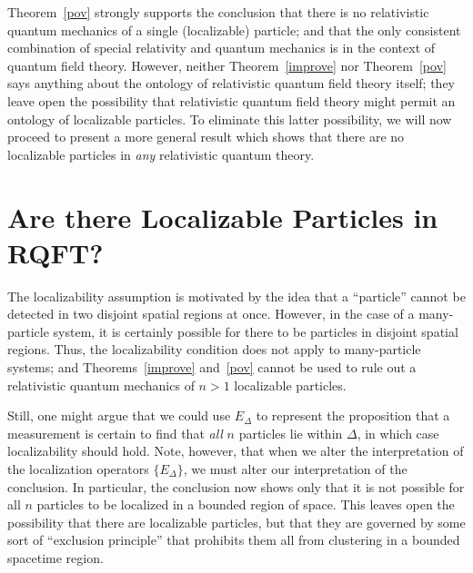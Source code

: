 \documentclass[11pt]{article}
\theoremstyle{remark}
\begin{document}
Theorem~\ref{pov} strongly supports the conclusion that there is no
relativistic quantum mechanics of a single (localizable) particle; and
that the only consistent combination of special relativity and quantum
mechanics is in the context of quantum field theory.  However, neither
Theorem~\ref{improve} nor Theorem~\ref{pov} says anything about the
ontology of relativistic quantum field theory itself; they leave open
the possibility that relativistic quantum field theory might permit an
ontology of localizable particles.  To eliminate this latter
possibility, we will now proceed to present a more general result
which shows that there are no localizable particles in \emph{any}
relativistic quantum theory.

\section{Are there Localizable Particles in RQFT?} \label{numbers}
The localizability assumption is motivated by the idea that a
``particle'' cannot be detected in two disjoint spatial regions at
once.  However, in the case of a many-particle system, it is certainly
possible for there to be particles in disjoint spatial regions.  Thus,
the localizability condition does not apply to many-particle systems;
and Theorems~\ref{improve} and~\ref{pov} cannot be used to rule out a
relativistic quantum mechanics of $n>1$ localizable particles.

Still, one might argue that we could use $E_{\Delta}$ to represent the
proposition that a measurement is certain to find that \emph{all} $n$
particles lie within $\Delta$, in which case localizability should
hold.  Note, however, that when we alter the interpretation of the
localization operators $\{ E_{\Delta} \}$, we must alter our
interpretation of the conclusion.  In particular, the conclusion now
shows only that it is not possible for all $n$ particles to be
localized in a bounded region of space.  This leaves open the
possibility that there are localizable particles, but that they are
governed by some sort of ``exclusion principle'' that prohibits them
all from clustering in a bounded spacetime region.
\end{document}
